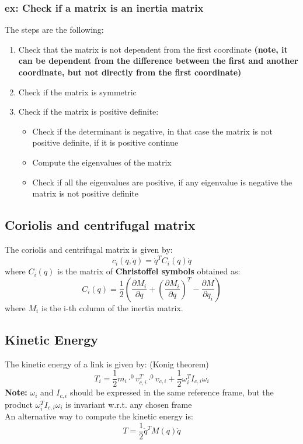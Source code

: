 \documentclass[a4paper,12pt]{article}
\begin{document}
\subsubsection{ex: Check if a matrix is an inertia matrix}
The steps are the following:
\begin{enumerate}
    \item Check that the matrix is not dependent from the first coordinate \textbf{(note, it can be dependent from the 
    difference between the first and another coordinate, but not directly from the first coordinate)}
    \item Check if the matrix is symmetric
    \item Check if the matrix is positive definite: \begin{itemize}
        \item Check if the determinant is negative, in that case the 
        matrix is not positive definite, if it is positive continue
        \item Compute the eigenvalues of the matrix
        \item Check if all the eigenvalues are positive, if any eigenvalue is negative the 
        matrix is not positive definite
    \end{itemize}
    
\end{enumerate}

\subsection{Coriolis and centrifugal matrix} \label{sec:Coriolis and centrifugal matrix}
The coriolis and centrifugal matrix is given by:\begin{equation}
    c_i(q, \dot{q}) = \dot{q}^T C_i(q) \dot{q}
\end{equation}
where $C_i(q)$ is the matrix of \textbf{Christoffel symbols} obtained as:
\begin{equation}
    C_i(q) = \frac{1}{2}  \left( \frac{\partial M_{i}}{\partial q} + (\frac{\partial M_{i}}{\partial q})^T - \frac{\partial M}{\partial q_i} \right)
\end{equation}
where $M_i$ is the i-th column of the inertia matrix.


\subsection{Kinetic Energy}\label{sec:Kinetic Energy}
The kinetic energy of a link is given by: (Konig theorem)
\begin{equation}
    T_i = \frac{1}{2} m_i\cdot^0v_{c,i}^T\cdot^0v_{c,i} + \frac{1}{2} \omega_i^T I_{c,i} \omega_i
\end{equation}
\textbf{Note:} $\omega_i$ and $I_{c,i}$ should be expressed in the same reference frame,
but the product $\omega_i^T I_{c,i} \omega_i$ is invariant w.r.t. any chosen frame\\
An alternative way to compute the kinetic energy is:
\begin{equation}
    T = \frac{1}{2} \dot{q}^T M(q) \dot{q}
\end{equation}
\end{document}

